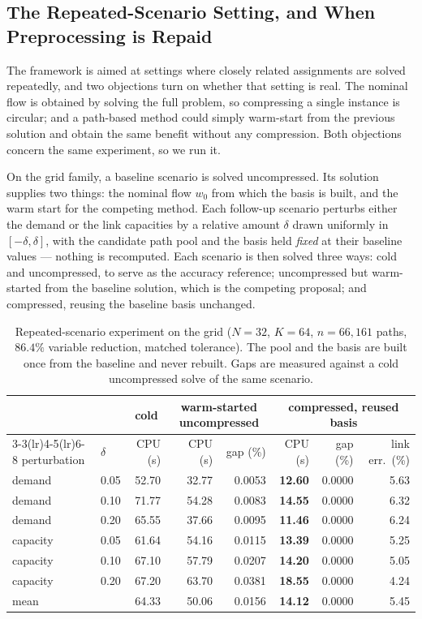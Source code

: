 \documentclass[11pt]{article}
\begin{document}
\subsection{The Repeated-Scenario Setting, and When Preprocessing is Repaid}
\label{sec:repeated}

The framework is aimed at settings where closely related assignments are solved repeatedly, and
two objections turn on whether that setting is real. The nominal flow is obtained by solving the
full problem, so compressing a single instance is circular; and a path-based method could
simply warm-start from the previous solution and obtain the same benefit without any
compression. Both objections concern the same experiment, so we run it.

On the grid family, a baseline scenario is solved uncompressed. Its solution supplies two
things: the nominal flow $w_0$ from which the basis is built, and the warm start for the
competing method. Each follow-up scenario perturbs either the demand or the link capacities by
a relative amount $\delta$ drawn uniformly in $[-\delta,\delta]$, with the candidate path pool
and the basis held \emph{fixed} at their baseline values --- nothing is recomputed. Each
scenario is then solved three ways: cold and uncompressed, to serve as the accuracy reference;
uncompressed but warm-started from the baseline solution, which is the competing proposal; and
compressed, reusing the baseline basis unchanged.

\begin{table}[h]
\centering
\caption{Repeated-scenario experiment on the grid ($N=32$, $K=64$, $n=66{,}161$ paths, $86.4\%$
variable reduction, matched tolerance). The pool and the basis are built once from the baseline
and never rebuilt. Gaps are measured against a cold uncompressed solve of the same scenario.}
\label{tab:repeated}
{\small
\begin{tabular}{llrrrrrr}
\toprule
& & \multicolumn{1}{c}{cold} & \multicolumn{2}{c}{warm-started uncompressed}
& \multicolumn{3}{c}{compressed, reused basis}\\
\cmidrule(lr){3-3}\cmidrule(lr){4-5}\cmidrule(lr){6-8}
perturbation & $\delta$ & CPU (s) & CPU (s) & gap (\%) & CPU (s) & gap (\%) & link err.\ (\%)\\
\midrule
demand   & 0.05 & 52.70 & 32.77 & 0.0053 & \textbf{12.60} & 0.0000 & 5.63\\
demand   & 0.10 & 71.77 & 54.28 & 0.0083 & \textbf{14.55} & 0.0000 & 6.32\\
demand   & 0.20 & 65.55 & 37.66 & 0.0095 & \textbf{11.46} & 0.0000 & 6.24\\
capacity & 0.05 & 61.64 & 54.16 & 0.0115 & \textbf{13.39} & 0.0000 & 5.25\\
capacity & 0.10 & 67.10 & 57.79 & 0.0207 & \textbf{14.20} & 0.0000 & 5.05\\
capacity & 0.20 & 67.20 & 63.70 & 0.0381 & \textbf{18.55} & 0.0000 & 4.24\\
\midrule
mean     &      & 64.33 & 50.06 & 0.0156 & \textbf{14.12} & 0.0000 & 5.45\\
\bottomrule
\end{tabular}}
\end{table}
\end{document}
